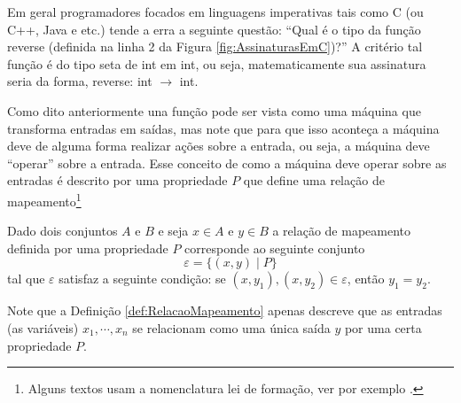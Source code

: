 \begin{note}
	Em geral programadores focados em linguagens imperativas tais como C (ou C++, Java e etc.) tende a erra a seguinte questão: ``Qual é o tipo da função reverse (definida na linha 2 da Figura \ref{fig:AssinaturasEmC})?'' A critério tal função é do tipo seta de int em int, ou seja, matematicamente sua assinatura seria da forma, reverse: int $\rightarrow$ int.
\end{note}

Como dito anteriormente una função pode ser vista como uma máquina que transforma entradas em saídas, mas note que para que isso aconteça a máquina deve de alguma forma realizar ações sobre a entrada, ou seja, a máquina deve ``operar'' sobre a entrada. Esse conceito de como a máquina deve operar sobre as entradas é descrito por uma propriedade $P$ que define uma relação de mapeamento\footnote{Alguns textos usam a nomenclatura lei de formação, ver por exemplo \cite{carmo2013}.}

\begin{definition}\label{def:RelacaoMapeamento}
	Dado dois conjuntos $A$ e $B$ e seja $x \in A$ e $y \in B$ a relação de mapeamento definida por uma propriedade $P$ corresponde  ao seguinte conjunto 
	$$\varepsilon = \{(x, y)\mid P\}$$ tal que $\varepsilon$ satisfaz a seguinte condição: se $(x, y_1), (x, y_2) \in \varepsilon$, então $y_1 = y_2$.
\end{definition}

Note que a Definição \ref{def:RelacaoMapeamento} apenas descreve que as entradas (as variáveis) $x_1, \cdots, x_n$ se relacionam como uma única saída $y$ por uma certa propriedade $P$.

